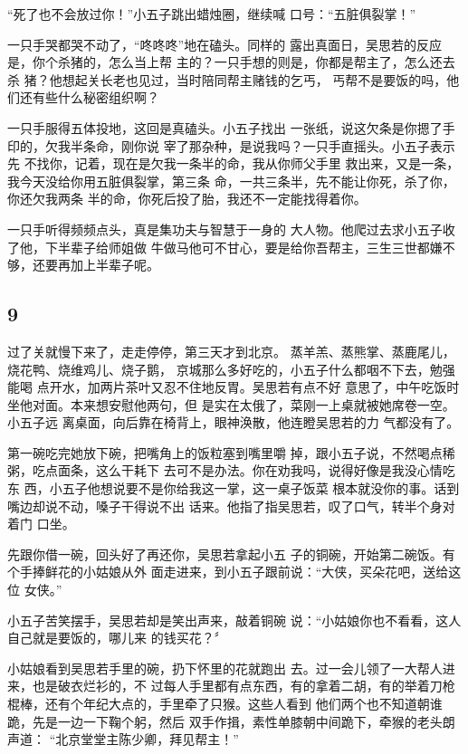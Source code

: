 “死了也不会放过你！”小五子跳出蜡烛圈，继续喊
口号：“五脏俱裂掌！”

一只手哭都哭不动了，“咚咚咚”地在磕头。同样的
露出真面日，吴思若的反应是，你个杀猪的，怎么当上帮
主的？一只手想的则是，你都是帮主了，怎么还去杀
猪？他想起关长老也见过，当时陪同帮主赌钱的乞丐，
丐帮不是要饭的吗，他们还有些什么秘密组织啊？

一只手服得五体投地，这回是真磕头。小五子找出
一张纸，说这欠条是你摁了手印的，欠我半条命，刚你说
宰了那杂种，是说我吗？一只手直摇头。小五子表示先
不找你，记着，现在是欠我一条半的命，我从你师父手里
救出来，又是一条，我今天没给你用五脏俱裂掌，第三条
命，一共三条半，先不能让你死，杀了你，你还欠我两条
半的命，你死后投了胎，我还不一定能找得着你。

一只手听得频频点头，真是集功夫与智慧于一身的
大人物。他爬过去求小五子收了他，下半辈子给师姐做
牛做马他可不甘心，要是给你吾帮主，三生三世都嫌不
够，还要再加上半辈子呢。
\newline

{\centering\subsection{9}}

过了关就慢下来了，走走停停，第三天才到北京。
蒸羊羔、蒸熊掌、蒸鹿尾儿，烧花鸭、烧维鸡儿、烧子鹅，
京城那么多好吃的，小五子什么都咽不下去，勉强能喝
点开水，加两片茶叶又忍不住地反胃。吴思若有点不好
意思了，中午吃饭时坐他对面。本来想安慰他两句，但
是实在太俄了，菜刚一上桌就被她席卷一空。小五子远
离桌面，向后靠在椅背上，眼神涣散，他连瞪吴思若的力
气都没有了。

第一碗吃完她放下碗，把嘴角上的饭粒塞到嘴里嚼
掉，跟小五子说，不然喝点稀粥，吃点面条，这么干耗下
去可不是办法。你在劝我吗，说得好像是我没心情吃东
西，小五子他想说要不是你给我这一掌，这一桌子饭菜
根本就没你的事。话到嘴边却说不动，嗓子干得说不出
话来。他指了指吴思若，叹了口气，转半个身对着门
口坐。

先跟你借一碗，回头好了再还你，吴思若拿起小五
子的铜碗，开始第二碗饭。有个手捧鲜花的小姑娘从外
面走进来，到小五子跟前说：“大侠，买朵花吧，送给这位
女侠。”

小五子苦笑摆手，吴思若却是笑出声来，敲着铜碗
说：“小姑娘你也不看看，这人自己就是要饭的，哪儿来
的钱买花？〞

小姑娘看到吴思若手里的碗，扔下怀里的花就跑出
去。过一会儿领了一大帮人进来，也是破衣烂衫的，不
过每人手里都有点东西，有的拿着二胡，有的举着刀枪
棍棒，还有个年纪大点的，手里牵了只猴。这些人看到
他们两个也不知道朝谁跪，先是一边一下鞠个躬，然后
双手作揖，素性单膝朝中间跪下，牵猴的老头朗声道：
“北京堂堂主陈少卿，拜见帮主！”

